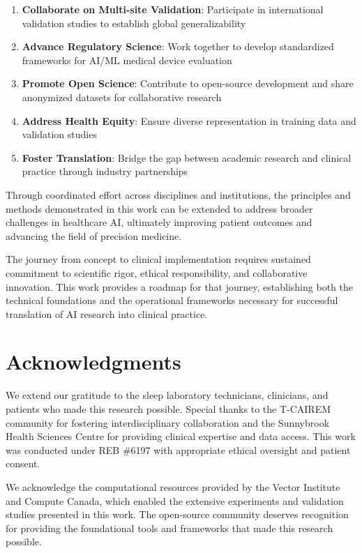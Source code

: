 \documentclass[11pt]{article}
\begin{document}
\begin{enumerate}
    \item \textbf{Collaborate on Multi-site Validation}: Participate in international validation studies to establish global generalizability
    
    \item \textbf{Advance Regulatory Science}: Work together to develop standardized frameworks for AI/ML medical device evaluation
    
    \item \textbf{Promote Open Science}: Contribute to open-source development and share anonymized datasets for collaborative research
    
    \item \textbf{Address Health Equity}: Ensure diverse representation in training data and validation studies
    
    \item \textbf{Foster Translation}: Bridge the gap between academic research and clinical practice through industry partnerships
\end{enumerate}

Through coordinated effort across disciplines and institutions, the principles and methods demonstrated in this work can be extended to address broader challenges in healthcare AI, ultimately improving patient outcomes and advancing the field of precision medicine.

The journey from concept to clinical implementation requires sustained commitment to scientific rigor, ethical responsibility, and collaborative innovation. This work provides a roadmap for that journey, establishing both the technical foundations and the operational frameworks necessary for successful translation of AI research into clinical practice.

\section*{Acknowledgments}

We extend our gratitude to the sleep laboratory technicians, clinicians, and patients who made this research possible. Special thanks to the T-CAIREM community for fostering interdisciplinary collaboration and the Sunnybrook Health Sciences Centre for providing clinical expertise and data access. This work was conducted under REB \#6197 with appropriate ethical oversight and patient consent.

We acknowledge the computational resources provided by the Vector Institute and Compute Canada, which enabled the extensive experiments and validation studies presented in this work. The open-source community deserves recognition for providing the foundational tools and frameworks that made this research possible.
\end{document}
